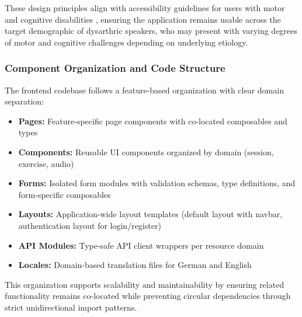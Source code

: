 These design principles align with accessibility guidelines for users with motor and cognitive disabilities \cite{wcag2021, iso9241_2019}, ensuring the application remains usable across the target demographic of dysarthric speakers, who may present with varying degrees of motor and cognitive challenges depending on underlying etiology.

\subsubsection{Component Organization and Code Structure}

The frontend codebase follows a feature-based organization with clear domain separation:

\begin{itemize}
    \item \textbf{Pages:} Feature-specific page components with co-located composables and types
    \item \textbf{Components:} Reusable UI components organized by domain (session, exercise, audio)
    \item \textbf{Forms:} Isolated form modules with validation schemas, type definitions, and form-specific composables
    \item \textbf{Layouts:} Application-wide layout templates (default layout with navbar, authentication layout for login/register)
    \item \textbf{API Modules:} Type-safe API client wrappers per resource domain
    \item \textbf{Locales:} Domain-based translation files for German and English
\end{itemize}

This organization supports scalability and maintainability by ensuring related functionality remains co-located while preventing circular dependencies through strict unidirectional import patterns.
